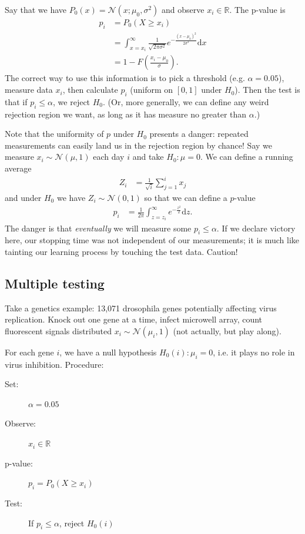 \documentclass[11pt,letterpaper]{article}
\renewcommand{\d}{\mathrm{d}}
\theoremstyle{definition}
\theoremstyle{plain}
\numberwithin{equation}{section}
\numberwithin{figure}{section}
\begin{document}
Say that we have $P_0(x) = \mathcal{N}(x;\mu_0, \sigma^2)$ and observe $x_i \in \mathbb{R}$. The p-value is
%
\begin{align}
	p_i &= P_0(X \geq x_i)\\
	    &= \int_{x=x_i}^\infty \frac{1}{\sqrt{2\pi\sigma^2}} e^{-\frac{(x-\mu_0)^2}{2\sigma^2}} \d x\\
	    &= 1 - F\left(\frac{x_i-\mu_0}{\sigma}\right).
\end{align}
%
The correct way to use this information is to pick a threshold (e.g. $\alpha = 0.05$), measure data $x_i$, then calculate $p_i$ (uniform on $[0,1]$ under $H_0$). Then the test is that if $p_i \leq \alpha$, we reject $H_0$. (Or, more generally, we can define any weird rejection region we want, as long as it has measure no greater than $\alpha$.)


Note that the uniformity of $p$ under $H_0$ presents a danger: repeated measurements can easily land us in the rejection region by chance! Say we measure $x_i \sim \mathcal{N}(\mu,1)$ each day $i$ and take $H_0: \mu=0$. We can define a running average
%
\begin{align}
	Z_i &= \frac{1}{\sqrt{i}} \sum_{j=1}^i x_j
\end{align}
%
and under $H_0$ we have $Z_i \sim \mathcal{N}(0,1)$ so that we can define a $p$-value
%
\begin{align}
	p_i &= \frac{1}{2\pi} \int_{z=z_i}^\infty e^{-\frac{z^2}{2}} \d z.
\end{align}
%
The danger is that \emph{eventually} we will measure some $p_i \leq \alpha$. If we declare victory here, our stopping time was not independent of our measurements; it is much like tainting our learning process by touching the test data. Caution!










\subsection{Multiple testing}
Take a genetics example: 13,071 drosophila genes potentially affecting virus replication. Knock out one gene at a time, infect microwell array, count fluorescent signals distributed $x_i \sim \mathcal{N}(\mu_i,1)$ (not actually, but play along).

For each gene $i$, we have a null hypothesis $H_0(i) : \mu_i = 0$, i.e. it plays no role in virus inhibition. Procedure:
%
\begin{description}
	\item[Set:] $\alpha=0.05$
	\item[Observe:] $x_i \in \mathbb{R}$
	\item[p-value:] $p_i = P_0(X \geq x_i)$
	\item[Test:] If $p_i \leq \alpha$, reject $H_0(i)$
\end{description}
\end{document}
